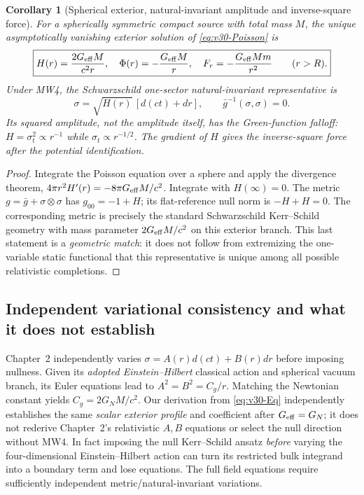 \documentclass[11pt,a4paper]{article}
\newtheorem{corollary}[theorem]{Corollary}
\theoremstyle{remark}\newtheorem{remark}[theorem]{Remark}
\begin{document}
\begin{corollary}[Spherical exterior, natural-invariant amplitude and inverse-square force]\label{cor:v30-exterior}
For a spherically symmetric compact source with total mass $M$, the unique asymptotically vanishing exterior solution of \eqref{eq:v30-Poisson} is
\begin{equation}\label{eq:v30-exterior}
\boxed{H(r)=\frac{2G_{\rm eff}M}{c^2r},\quad
\Phi(r)=-\frac{G_{\rm eff}M}{r},\quad
F_r=-\frac{G_{\rm eff}Mm}{r^2}\qquad(r>R).}
\end{equation}
Under MW4, the Schwarzschild one-sector natural-invariant representative is
\begin{equation}\label{eq:v30-sigma}
\boxed{\sigma=\sqrt{H(r)}\,[d(ct)+dr],\qquad
\bar g^{-1}(\sigma,\sigma)=0.}
\end{equation}
Its squared amplitude, not the amplitude itself, has the Green-function falloff: $H=\sigma_t^2\propto r^{-1}$ while $\sigma_t\propto r^{-1/2}$. The gradient of $H$ gives the inverse-square force after the potential identification.
\end{corollary}
\begin{proof} Integrate the Poisson equation over a sphere and apply the divergence theorem, $4\pi r^2H'(r)=-8\pi G_{\rm eff}M/c^2$. Integrate with $H(\infty)=0$. The metric $g=\bar g+\sigma\otimes\sigma$ has $g_{00}=-1+H$; its flat-reference null norm is $-H+H=0$. The corresponding metric is precisely the standard Schwarzschild Kerr--Schild geometry with mass parameter $2G_{\rm eff}M/c^2$ on this exterior branch. This last statement is a \emph{geometric match}: it does not follow from extremizing the one-variable static functional that this representative is unique among all possible relativistic completions.\end{proof}

\subsection{Independent variational consistency and what it does not establish}
Chapter~2 independently varies $\sigma=A(r)d(ct)+B(r)dr$ before imposing nullness. Given its \emph{adopted Einstein--Hilbert} classical action and spherical vacuum branch, its Euler equations lead to $A^2=B^2=C_g/r$. Matching the Newtonian constant yields $C_g=2G_NM/c^2$. Our derivation from \eqref{eq:v30-Eq} independently establishes the same \emph{scalar exterior profile} and coefficient after $G_{\rm eff}=G_N$; it does not rederive Chapter~2's relativistic $A,B$ equations or select the null direction without MW4. In fact imposing the null Kerr--Schild ansatz \emph{before} varying the four-dimensional Einstein--Hilbert action can turn its restricted bulk integrand into a boundary term and lose equations. The full field equations require sufficiently independent metric/natural-invariant variations.
\end{document}

